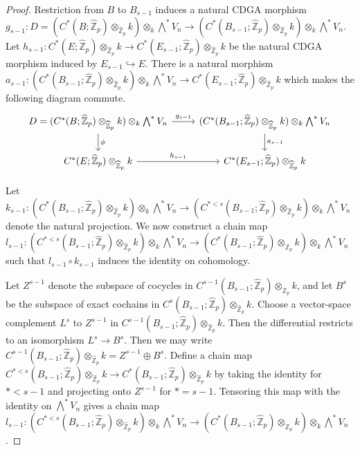 \documentclass[11pt]{amsart}
\theoremstyle{definition}
\numberwithin{equation}{section}
\numberwithin{equation}{section}
\newcommand\ZZ{\mathbb{Z}}
\begin{document}
\begin{proof}
Restriction from $B$ to $B_{s-1}$ induces a natural CDGA morphism $g_{s-1}:D=(C^*(B;\widehat{\ZZ}_p)\otimes_{\widehat{\ZZ}_p} k)\otimes_k \bigwedge^*V_n\rightarrow (C^*(B_{s-1};\widehat{\ZZ}_p)\otimes_{\widehat{\ZZ}_p} k)\otimes_k \bigwedge^*V_n$. Let $h_{s-1}:C^*(E;\widehat{\ZZ}_p)\otimes_{\widehat{\ZZ}_p} k\rightarrow C^*(E_{s-1};\widehat{\ZZ}_p)\otimes_{\widehat{\ZZ}_p} k$ be the natural CDGA morphism induced by $E_{s-1}\hookrightarrow E$. There is a natural morphism $a_{s-1}:(C^*(B_{s-1};\widehat{\ZZ}_p)\otimes_{\widehat{\ZZ}_p} k)\otimes_k \bigwedge^*V_n\rightarrow C^*(E_{s-1};\widehat{\ZZ}_p)\otimes_{\widehat{\ZZ}_p} k$ which makes the following diagram commute.
\[
\begin{tikzcd}
   D=(C^*(B;\widehat{\ZZ}_p)\otimes_{\widehat{\ZZ}_p} k)\otimes_k \bigwedge^*V_n \arrow[r,"g_{s-1}"] \arrow[d,"\phi"] & (C^*(B_{s-1};\widehat{\ZZ}_p)\otimes_{\widehat{\ZZ}_p} k)\otimes_k \bigwedge^*V_n \arrow[d,"a_{s-1}"] \\
   C^*(E;\widehat{\ZZ}_p)\otimes_{\widehat{\ZZ}_p} k \arrow[r,"h_{s-1}"] & C^*(E_{s-1};\widehat{\ZZ}_p)\otimes_{\widehat{\ZZ}_p} k
\end{tikzcd}
\]

Let $k_{s-1}:(C^*(B_{s-1};\widehat{\ZZ}_p)\otimes_{\widehat{\ZZ}_p} k)\otimes_k \bigwedge^*V_n\rightarrow (C^{*<s}(B_{s-1};\widehat{\ZZ}_p)\otimes_{\widehat{\ZZ}_p} k)\otimes_k \bigwedge^*V_n$ denote the natural projection. We now construct a chain map $l_{s-1}:(C^{*<s}(B_{s-1};\widehat{\ZZ}_p)\otimes_{\widehat{\ZZ}_p} k)\otimes_k \bigwedge^*V_n\rightarrow (C^*(B_{s-1};\widehat{\ZZ}_p)\otimes_{\widehat{\ZZ}_p} k)\otimes_k \bigwedge^*V_n$ such that $l_{s-1}\circ k_{s-1}$ induces the identity on cohomology.

Let $Z^{s-1}$ denote the subspace of cocycles in $C^{s-1}(B_{s-1};\widehat{\ZZ}_p)\otimes_{\widehat{\ZZ}_p} k$, and let $B^{s}$ be the subspace of exact cochains in $C^{s}(B_{s-1};\widehat{\ZZ}_p)\otimes_{\widehat{\ZZ}_p} k$. Choose a vector-space complement $L^s$ to $Z^{s-1}$ in  $C^{s-1}(B_{s-1};\widehat{\ZZ}_p)\otimes_{\widehat{\ZZ}_p} k$. Then the differential restricts to an isomorphism $L^s\rightarrow B^s$. Then we may write $C^{s-1}(B_{s-1};\widehat{\ZZ}_p)\otimes_{\widehat{\ZZ}_p} k=Z^{s-1}\oplus B^{s}$.
Define a chain map $C^{*<s}(B_{s-1};\widehat{\ZZ}_p)\otimes_{\widehat{\ZZ}_p} k\rightarrow C^{*}(B_{s-1};\widehat{\ZZ}_p)\otimes_{\widehat{\ZZ}_p} k$ by taking the identity for $*<s-1$ and projecting onto $Z^{s-1}$ for $*=s-1$. Tensoring this map with the identity on $\bigwedge^*V_n$ gives a chain map $l_{s-1}:(C^{*<s}(B_{s-1};\widehat{\ZZ}_p)\otimes_{\widehat{\ZZ}_p} k)\otimes_k \bigwedge^*V_n\rightarrow (C^{*}(B_{s-1};\widehat{\ZZ}_p)\otimes_{\widehat{\ZZ}_p} k)\otimes_k \bigwedge^*V_n$.
\medskip


\end{proof}
\end{document}
